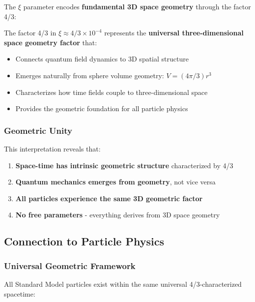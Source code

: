 \documentclass[12pt,a4paper]{article}
\newcommand{\xipar}{\ensuremath{\xi}}
\newcommand{\mypi}{\ensuremath{\pi}}
\newcommand{\mytimes}{\ensuremath{\times}}
\newcommand{\myapprox}{\ensuremath{\approx}}
\begin{document}
	The $\xi$ parameter encodes \textbf{fundamental 3D space geometry} through the factor 4/3:
	
	\begin{tcolorbox}[colback=yellow!5!white,colframe=orange!75!black,title=Three-Dimensional Space Geometry Factor]
		The factor 4/3 in $\xipar \myapprox 4/3 \mytimes 10^{-4}$ represents the \textbf{universal three-dimensional space geometry factor} that:
		\begin{itemize}
			\item Connects quantum field dynamics to 3D spatial structure
			\item Emerges naturally from sphere volume geometry: $V = (4\mypi/3)r^3$
			\item Characterizes how time fields couple to three-dimensional space
			\item Provides the geometric foundation for all particle physics
		\end{itemize}
	\end{tcolorbox}
	
	\subsubsection{Geometric Unity}
	\label{subsubsec:geometric_unity}
	
	This interpretation reveals that:
	\begin{enumerate}
		\item \textbf{Space-time has intrinsic geometric structure} characterized by 4/3
		\item \textbf{Quantum mechanics emerges from geometry}, not vice versa
		\item \textbf{All particles experience the same 3D geometric factor}
		\item \textbf{No free parameters} - everything derives from 3D space geometry
	\end{enumerate}
	
	\subsection{Connection to Particle Physics}
	\label{subsec:connection_particle_physics}
	
	\subsubsection{Universal Geometric Framework}
	\label{subsubsec:universal_framework}
	
	All Standard Model particles exist within the same universal 4/3-characterized spacetime:
	
\end{document}
